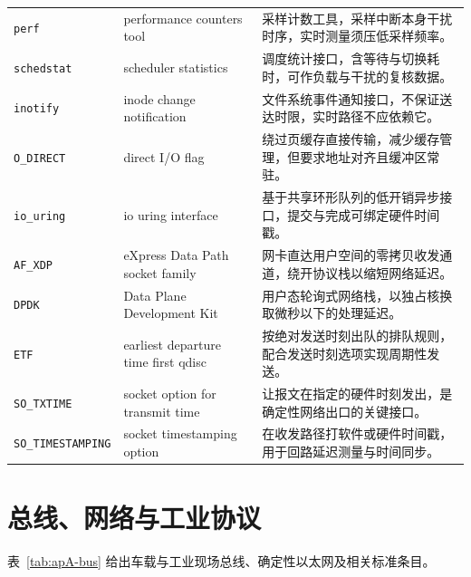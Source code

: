 \documentclass[12pt,a4paper,fontset=fandol]{ctexbook}
\newcommand{\Tp}[1]{\texttt{#1}}
\begin{document}
\begin{longtable}{@{} >{\raggedright\arraybackslash}p{} >{\raggedright\arraybackslash}p{} >{\raggedright\arraybackslash}p{}@{}}
\Tp{perf} & performance counters tool & 采样计数工具，采样中断本身干扰时序，实时测量须压低采样频率。 \\
\Tp{schedstat} & scheduler statistics & 调度统计接口，含等待与切换耗时，可作负载与干扰的复核数据。 \\
\Tp{inotify} & inode change notification & 文件系统事件通知接口，不保证送达时限，实时路径不应依赖它。 \\
\Tp{O\_DIRECT} & direct I/O flag & 绕过页缓存直接传输，减少缓存管理，但要求地址对齐且缓冲区常驻。 \\
\Tp{io\_uring} & io uring interface & 基于共享环形队列的低开销异步接口，提交与完成可绑定硬件时间戳。 \\
\Tp{AF\_XDP} & eXpress Data Path socket family & 网卡直达用户空间的零拷贝收发通道，绕开协议栈以缩短网络延迟。 \\
\Tp{DPDK} & Data Plane Development Kit & 用户态轮询式网络栈，以独占核换取微秒以下的处理延迟。 \\
\Tp{ETF} & earliest departure time first qdisc & 按绝对发送时刻出队的排队规则，配合发送时刻选项实现周期性发送。 \\
\Tp{SO\_TXTIME} & socket option for transmit time & 让报文在指定的硬件时刻发出，是确定性网络出口的关键接口。 \\
\Tp{SO\_TIMESTAMPING} & socket timestamping option & 在收发路径打软件或硬件时间戳，用于回路延迟测量与时间同步。 \\
\end{longtable}

\section{总线、网络与工业协议}

表~\ref{tab:apA-bus} 给出车载与工业现场总线、确定性以太网及相关标准条目。
\end{document}
